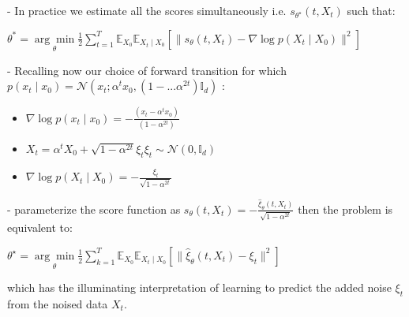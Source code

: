 
- In practice we estimate all the scores simultaneously i.e. $s_{\theta^{\star}}(t, X_{t})$ such that:

$\theta^* = \underset{\theta}{\arg\min} \frac{1}{2} \sum_{t=1}^{T} \mathbb{E}_{X_0} \mathbb{E}_{X_t \mid X_0}[\|s_\theta(t, X_t) - \nabla \log p(X_t \mid X_0)\|^2]$

- Recalling now our choice of forward transition for which $p(x_{t} \mid x_{0})=\mathcal{N}(x_{t} ; \alpha^{t} x_{0},(1-. ..\alpha^{2 t}) \mathbb{I}_{d})$ :

\begin{itemize}
  \item $\nabla \log p(x_{t} \mid x_{0})=-\frac{(x_{t}-\alpha^{t} x_{0})}{(1-\alpha^{2 t})}$

  \item $X_{t}=\alpha^{t} X_{0}+\sqrt{1-\alpha^{2 t}} \xi_{t} \xi_{t} \sim \mathcal{N}(0, \mathbb{I}_{d})$

  \item $\nabla \log p(X_{t} \mid X_{0})=-\frac{\xi_{t}}{\sqrt{1-\alpha^{2 t}}}$

\end{itemize}

- parameterize the score function as $s_{\theta}(t, X_{t})=-\frac{\hat{\xi}_{\theta}(t, X_{t})}{\sqrt{1-\alpha^{2 t}}}$ then the problem is equivalent to:

$
\theta^{\star}=\underset{\theta}{\arg \min } \frac{1}{2} \sum_{k=1}^{T} \mathbb{E}_{X_{0}} \mathbb{E}_{X_{t} \mid X_{0}}[\|\hat{\xi}_{\theta}(t, X_{t})-\xi_{t}\|^{2}]
$

which has the illuminating interpretation of learning to predict the added noise $\xi_{t}$ from the noised data $X_{t}$.

